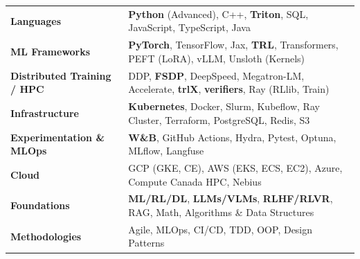 \begin{tabularx}{\textwidth}{@{} >{\bfseries}l L @{}}
Languages &
  \textbf{Python} (Advanced), C++, \textbf{Triton}, SQL, JavaScript, TypeScript, Java \\[2pt]
ML Frameworks &
  \textbf{PyTorch}, TensorFlow, Jax, \textbf{TRL}, Transformers, PEFT (LoRA), vLLM, Unsloth (Kernels) \\
Distributed Training / HPC &
  DDP, \textbf{FSDP}, DeepSpeed, Megatron-LM, Accelerate, \textbf{trlX}, \textbf{verifiers}, Ray (RLlib, Train) \\[2pt]
Infrastructure &
  \textbf{Kubernetes}, Docker, Slurm, Kubeflow, Ray Cluster, Terraform, PostgreSQL, Redis, S3 \\[2pt]
Experimentation \& MLOps &
  \textbf{W\&B}, GitHub Actions, Hydra, Pytest, Optuna, MLflow, Langfuse \\[2pt]
Cloud &
  GCP (GKE, CE), AWS (EKS, ECS, EC2), Azure, Compute Canada HPC, Nebius \\[2pt]
Foundations &
     \textbf{ML/RL/DL}, \textbf{LLMs/VLMs}, \textbf{RLHF/RLVR}, RAG, Math, Algorithms \& Data Structures \\
Methodologies &
  Agile, MLOps, CI/CD, TDD, OOP, Design Patterns \\[2pt]
\end{tabularx}






